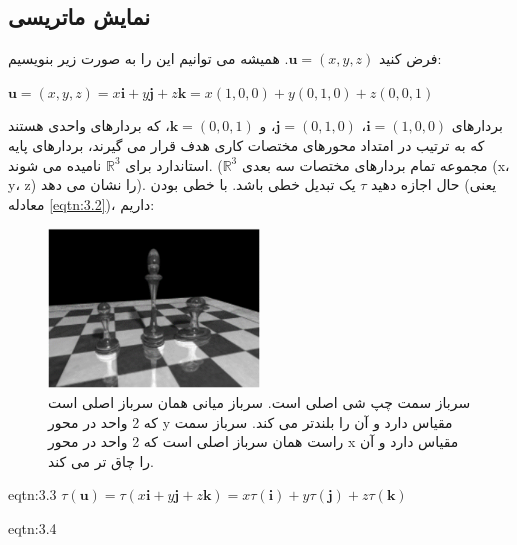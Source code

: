 \subsection{\textbf{نمایش ماتریسی}}
\label{subsec:3.1.2}
{
    \Large
    \begin{spacing}{1.5}
        فرض کنید $\textbf{u}=(x,y,z)$.
        همیشه می توانیم این را به صورت زیر بنویسیم:

        \begin{center}
            $\textbf{u}=(x,y,z)=x\textbf{i}+y\textbf{j}+z\textbf{k}=x(1,0,0)+y(0,1,0)+z(0,0,1)$
        \end{center}

        بردارهای $\textbf{i}=(1,0,0)$، $\textbf{j}=(0,1,0)$، و $\textbf{k}=(0,0,1)$، که بردارهای واحدی هستند
        که به ترتیب در امتداد محورهای مختصات کاری هدف قرار می گیرند، بردارهای پایه استاندارد برای $\mathbb{R}^3$ نامیده می شوند.
        ($\mathbb{R}^3$ مجموعه تمام بردارهای مختصات سه بعدی (x، y، z) را نشان می دهد).
        حال اجازه دهید $\tau$ یک تبدیل خطی باشد.
        با خطی بودن (یعنی معادله \ref{eqtn:3.2})، داریم:

        \begin{figure}[H]
            \centering
            \setlength{\belowcaptionskip}{-10pt}
            \includegraphics[width=0.5\textwidth]{Images/4/3/4.Session.1.3.1}
            \caption {سرباز سمت چپ شی اصلی است.
            سرباز میانی همان سرباز اصلی است که 2 واحد در محور y مقیاس دارد و آن را بلندتر می کند.
            سرباز سمت راست همان سرباز اصلی است که 2 واحد در محور x مقیاس دارد و آن را چاق تر می کند.}
            \label{fig:4.Session.1.3.1}
        \end{figure}

        \begin{eqtn}{eqtn:3.3}
            \centering
            $\tau(\textbf{u})=\tau(x\textbf{i}+y\textbf{j}+z\textbf{k})=x\tau(\textbf{i})+y\tau(\textbf{j})+z\tau(\textbf{k})$
        \end{eqtn}

        \begin{eqtn}{eqtn:3.4}
            \centering


\end{eqtn}
\end{spacing}}
